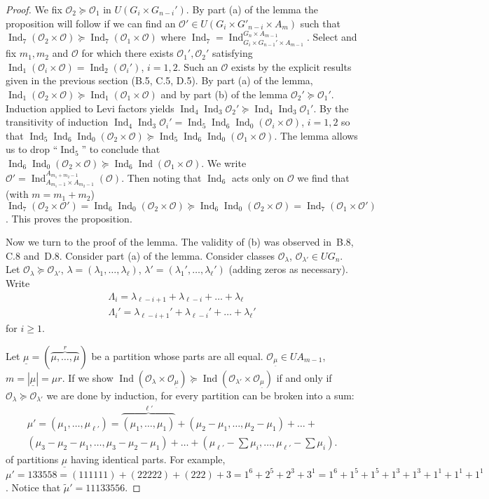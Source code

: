 \documentclass{amsart}
\newcommand\Am		{A_{m-1}}
\newcommand\Amone[1]{A_{m_{#1}-1}}
\newcommand\Ind	{\operatorname{Ind}}
\newcommand\lam	{\lambda}
\newcommand\lams	{(\lam_1,\dots,\lam_\ell)}
\newcommand\lamsprime{(\lam_1',\dots,\lam_\ell')}
\newcommand\cO		{{\mathcal O}}
\newcommand\x		{\times}
\begin{document}
\begin{proof}
We fix $\cO_2 \succeq \cO_1$ in $U(G_i \times G_{n-i}')$.  By part
(a) of the 
lemma the proposition will follow if we can find an 
$\cO' \in U(G_i \x G'_{n-i} \x A_m)$ such that 
$\Ind_7 (\cO_2 \x \cO) \succeq \Ind_7 (\cO_1 \x \cO)$ where 
$\Ind_7 = \Ind_{G_i \x G_{n-1}' \x A_{m-1}}^{G_n \x \Am}$. 
Select
and fix $m_1,m_2$ and $\cO$ for which there exists $\cO_1', \cO_2'$
satisfying
$\Ind_1 (\cO_i \x \cO) = \Ind_2 (\cO_i')$, $i=1,2$.  Such an $\cO$
exists by
the explicit results given in the previous section (B.5, C.5,
D.5).  
By part (a) of the lemma,
$\Ind_1 (\cO_2 \x \cO) \succeq \Ind_1(\cO_1 \x \cO)$ and by part (b)
of the
lemma $\cO_2' \succeq \cO_1'$.  Induction applied to Levi factors
yields
$\Ind_4 \Ind_3 \cO_2' \succeq \Ind_4 \Ind_3 \cO_1'$.  By the
transitivity
of induction $\Ind_4 \Ind_3 \cO_i' = \Ind_5 \Ind_6 \Ind_0 (\cO_i \x
\cO)$, 
$i=1,2$ so that 
$\Ind_5 \Ind_6 \Ind_0 (\cO_2 \x \cO) \succeq \Ind_5 \Ind_6 \Ind_0
(\cO_1 \x \cO)$.
The lemma allows us to drop ``$\Ind_5$'' to conclude that
$\Ind_6 \Ind_0 (\cO_2 \x \cO) \succeq \Ind_6 \Ind(\cO_1 \x \cO)$.  We
write
$\cO' = \Ind_{\Amone{1} \x \Amone{2}}^{A_{m_1+m_2-1}}(\cO)$.  Then
noting that
$\Ind_6$ acts only on $\cO$ we find that (with $m = m_1 + m_2$)
$\Ind_7 (\cO_2 \x \cO') = \Ind_6 \Ind_0 (\cO_2 \x \cO) \succeq
     \Ind_6 \Ind_0 (\cO_2 \x \cO) = \Ind_7 (\cO_1 \x \cO')$.  
This proves the proposition.

Now we turn to the proof of the lemma.  The validity of (b) was
observed
in~B.8, C.8 and~D.8.  Consider part (a) of the lemma. Consider
classes 
$\cO_\lam$, $\cO_{\lam'} \in UG_n.$  Let $\cO_\lam \succeq
\cO_{\lam'}$, 
$\lam = \lams$, $\lam' = \lamsprime$ (adding zeros as necessary).
Write
      \begin{gather}
\Lambda_i = \lam_{\ell-i+1} + \lam_{\ell-i} +\dots+ \lam_\ell \\
\Lambda_i' = \lam_{\ell-i+1}' + \lam_{\ell-i}' +\dots+ \lam_\ell'
     \end{gather}
 for $i \ge 1$.

Let $\underline{\mu} = (\overbrace{\mu ,\dots, \mu}^r)$ be a
partition
whose parts are all equal.  $\cO_{\underline{\mu}} \in U\Am$, 
$m = |\underline{\mu}| = \mu r$.  
If we show 
$\Ind (\cO_\lam \x \cO_{\underline{\mu}}) \succeq 
     \Ind (\cO_{\lam'} \x \cO_{\underline{\mu}})$ 
if and only if $\cO_\lam \succeq \cO_{\lam'}$ we are done by
induction, 
for every partition can be broken into a sum:
     \begin{multline*}
     \mu' = (\mu_1 ,\dots, \mu_{\ell'}) = 
          \overbrace{(\mu_1 ,\dots, \mu_1)}^{\ell'}
          + (\mu_2-\mu_1 ,\dots, \mu_2-\mu_1) +\dots+ \\
     (\mu_3-\mu_2-\mu_1 ,\dots, \mu_3-\mu_2-\mu_1)
          +\dots+ (\mu_{\ell'} - \sum \mu_i ,\dots, \mu_{\ell'} -
\sum \mu_i).
     \end{multline*}
of partitions $\underline{\mu}$ having identical parts.  For
example, 
$\mu' = 133558 = (111111) + (22222) + (222) + 3 = 1^6 + 2^5 + 2^3
+ 3^1
     = 1^6 + 1^5 + 1^5 + 1^3 + 1^3 + 1^1 + 1^1 + 1^1$.  
Notice that $\tilde\mu' = 11133556$.


\end{proof}
\end{document}
